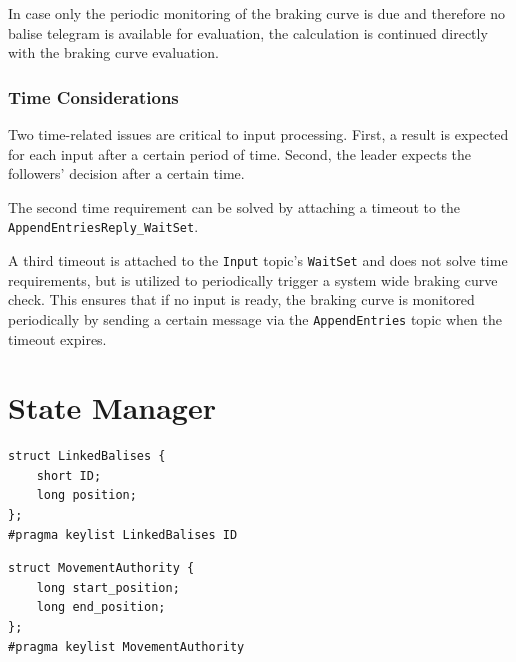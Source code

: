 In case only the periodic monitoring of the braking curve is due and therefore no balise telegram is available for evaluation, the calculation is continued directly with the braking curve evaluation.

\subsubsection{Time Considerations}
Two time-related issues are critical to input processing.
First, a result is expected for each input after a certain period of time.
Second, the leader expects the followers' decision after a certain time.

The second time requirement can be solved by attaching a timeout to the \texttt{AppendEntriesReply\_WaitSet}.

A third timeout is attached to the \texttt{Input} topic's \texttt{WaitSet} and does not solve time requirements, but is utilized to periodically trigger a system wide braking curve check.
This ensures that if no input is ready, the braking curve is monitored periodically by sending a certain message via the \texttt{AppendEntries} topic when the timeout expires.

\section{State Manager}

\begin{lstlisting}[caption={\abr{IDL} definition for the \texttt{LinkedBalises} topic. Each linked balise has an unique identifier and a position that is communicated to the system by the \abr{RBC}.}, label=code:linkedBalises]
struct LinkedBalises {
    short ID;
    long position;
};
#pragma keylist LinkedBalises ID
\end{lstlisting}

\begin{lstlisting}[caption={\abr{IDL} definition for the \texttt{MovementAuthority} topic. The \texttt{start\_position} encodes where the \abr{MA} starts and the \texttt{end\_position} encodes until where it is valid.}, label=code:movementAuthority]
struct MovementAuthority {
    long start_position;
    long end_position;
};
#pragma keylist MovementAuthority
\end{lstlisting}

